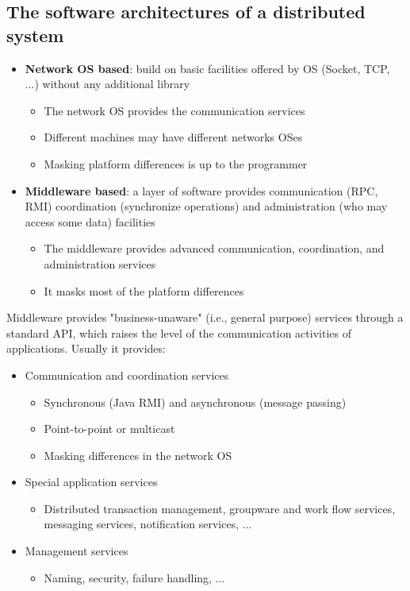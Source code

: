 \documentclass[10pt,a4paper]{article}
\begin{document}
\subsection{The software architectures of a distributed system}
\begin{itemize}
	\item \textbf{Network OS based}:  build on basic facilities offered by OS (Socket, TCP, ...) without any additional library
	\begin{itemize}
		\item The network OS provides the communication services
		\item Different machines may have different networks OSes
		\item Masking platform differences is up to the programmer
	\end{itemize}
	\item \textbf{Middleware based}: a layer of software provides communication (RPC, RMI) coordination (synchronize operations) and administration (who may access some data) facilities
	\begin{itemize}
		\item The middleware provides advanced communication, coordination, and administration services
		\item It masks most of the platform differences
	\end{itemize}
\end{itemize}
Middleware provides "business-unaware" (i.e., general purpose) services through a standard API, which raises the level of the communication activities of applications. Usually it provides:
\begin{itemize}
	\item Communication and coordination services
	\begin{itemize}
		\item Synchronous (Java RMI) and asynchronous (message passing)
		\item Point-to-point or multicast
		\item Masking differences in the network OS
	\end{itemize}
	\item Special application services
	\begin{itemize}
		\item Distributed transaction management, groupware and work flow services, messaging services, notification services, ...
	\end{itemize}
	\item Management services
	\begin{itemize}
		\item Naming, security, failure handling, ...
	\end{itemize}
\end{itemize}
\end{document}
